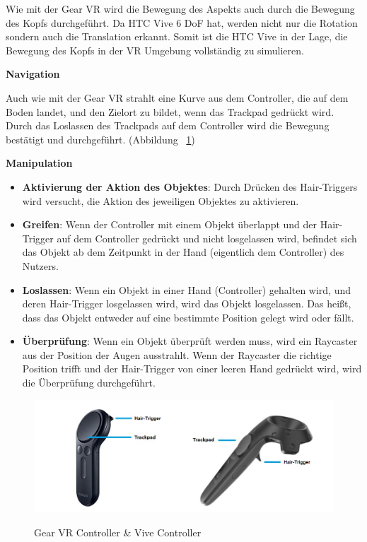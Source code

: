   \noindent
  Wie mit der Gear VR wird die Bewegung des Aspekts auch durch die Bewegung des Kopfs durchgeführt. Da HTC Vive 6 DoF hat, werden nicht nur die Rotation sondern auch die Translation erkannt. Somit ist die HTC Vive in der Lage, die Bewegung des Kopfs in der VR Umgebung vollständig zu simulieren.
  
  \vspace{1em}
  \noindent
  \textbf{Navigation}
  \vspace{1em}
  
  \noindent
  Auch wie mit der Gear VR strahlt eine Kurve aus dem Controller, die auf dem Boden landet, und den Zielort zu bildet, wenn das Trackpad gedrückt wird. Durch das Loslassen des Trackpads auf dem Controller wird die Bewegung bestätigt und durchgeführt. (Abbildung ~\ref{fig:gearViveController})
  
  \vspace{1em}
  \noindent
  \textbf{Manipulation}
  \vspace{1em}
  
  \begin{itemize}
  \item \textbf{Aktivierung der Aktion des Objektes}: Durch Drücken des Hair-Triggers wird versucht, die Aktion des jeweiligen Objektes zu aktivieren.
  \item \textbf{Greifen}: Wenn der Controller mit einem Objekt überlappt und der Hair-Trigger auf dem Controller gedrückt und nicht losgelassen wird, befindet sich das Objekt ab dem Zeitpunkt in der Hand (eigentlich dem Controller) des Nutzers.
  \item \textbf{Loslassen}: Wenn ein Objekt in einer Hand (Controller) gehalten wird, und deren Hair-Trigger losgelassen wird, wird das Objekt losgelassen. Das heißt, dass das Objekt entweder auf eine bestimmte Position gelegt wird oder fällt.
  \item \textbf{Überprüfung}: Wenn ein Objekt überprüft werden muss, wird ein Raycaster aus der Position der Augen ausstrahlt. Wenn der Raycaster die richtige Position trifft und der Hair-Trigger von einer leeren Hand gedrückt wird, wird die Überprüfung durchgeführt.
  \end{itemize}

\begin{figure}[ht]
\vspace*{1em}
\centering
\caption{Gear VR Controller \& Vive Controller}
\includegraphics[width=\textwidth]{images/gearViveController.png}
\label{fig:gearViveController} 
\end{figure}
  
